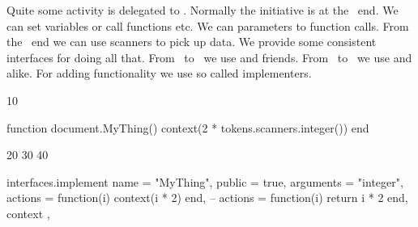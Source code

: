 


\startdocument
  [title={IMPLEMENTERS},
   banner={an old feature still evolving},
   location={context\enspace {\bf 2020}\enspace meeting}]

\starttitle[title=Interfacing with \LUA]

\startitemize

\startitem
    Quite some activity is delegated to \LUA.
\stopitem
\startitem
    Normally the initiative is at the \TEX\ end.
\stopitem
\startitem
    We can set variables or call functions etc.
\stopitem
\startitem
    We can parameters to function calls.
\stopitem
\startitem
    From the \LUA\ end we can use scanners to pick up data.
\stopitem
\startitem
    We provide some consistent interfaces for doing all that.
\stopitem
\startitem
    From \TEX\ to \LUA\ we use  and friends.
\stopitem
\startitem
    From \LUA\ to \TEX\ we use  and alike.
\stopitem
\startitem
    For adding functionality we use so called implementers.
\stopitem

\stopitemize

\stoptitle

\starttitle[title=Calling \LUA]

\startbuffer
{}
\stopbuffer

\typebuffer \getbuffer

\startbuffer
{} 10
\stopbuffer

\typebuffer \getbuffer

\startbuffer
\startluacode
function document.MyThing() context(2 * tokens.scanners.integer()) end
\stopluacode
\stopbuffer

\typebuffer \getbuffer

\startbuffer
{} 20 \quad
{} 30 \quad
{} 40
\stopbuffer

\typebuffer \getbuffer

\stoptitle

\starttitle[title=Streamlining \LUA]

\startbuffer
\startluacode
interfaces.implement {
    name      = "MyThing",
    public    = true,
    arguments = "integer",
    actions   =   function(i) context(i * 2) end,
 -- actions   = { function(i)  return i * 2  end, context },
}
\stopluacode
\stopbuffer

